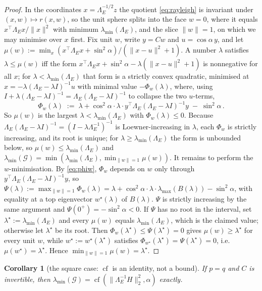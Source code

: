 \documentclass[11pt]{article}
\newtheorem{corollary}[theorem]{Corollary}
\theoremstyle{remark}
\newcommand{\Gr}{\mathcal{G}}
\newcommand{\Le}{\Lambda_E}
\begin{document}
\begin{proof}
In the coordinates $x=\Le^{-1/2}z$ the quotient \eqref{eq:rayleigh} is invariant under
$(x,w)\mapsto r(x,w)$, so the unit sphere splits into the face $w=0$, where it equals
$x^{\top}\Le x/\|x\|^{2}$ with minimum $\lambda_{\min}(\Le)$, and the slice $\|w\|=1$, on which we may
minimise over $x$ first. Fix unit $w$, write $y=Cw$ and $u=\cos\alpha\,y$, and let
$\mu(w):=\min_x(x^{\top}\Le x+\sin^2\alpha)/(\|x-u\|^2+1)$. A number $\lambda$ satisfies
$\lambda\le\mu(w)$ iff the form $x^{\top}\Le x+\sin^2\alpha-\lambda(\|x-u\|^2+1)$ is nonnegative for
all $x$; for $\lambda<\lambda_{\min}(\Le)$ that form is a strictly convex quadratic, minimised at
$x=-\lambda(\Le-\lambda I)^{-1}u$ with minimal value $-\Phi_w(\lambda)$, where, using
$I+\lambda(\Le-\lambda I)^{-1}=\Le(\Le-\lambda I)^{-1}$ to collapse the two $u$-terms,
\begin{equation}\label{eq:phiw}
  \Phi_w(\lambda)\;:=\;\lambda+\cos^2\alpha\cdot\lambda\cdot
  y^{\top}\Le(\Le-\lambda I)^{-1}y\;-\;\sin^2\alpha\,.
\end{equation}
So $\mu(w)$ is the largest $\lambda<\lambda_{\min}(\Le)$ with $\Phi_w(\lambda)\le0$. Because
$\Le(\Le-\lambda I)^{-1}=(I-\lambda\Le^{-1})^{-1}$ is Loewner-increasing in $\lambda$, each $\Phi_w$
is strictly increasing, and its root is unique; for $\lambda\ge\lambda_{\min}(\Le)$ the form is
unbounded below, so $\mu(w)\le\lambda_{\min}(\Le)$ and
$\lambda_{\min}(\Gr)=\min(\lambda_{\min}(\Le),\min_{\|w\|=1}\mu(w))$. It remains to perform the
$w$-minimisation. By \eqref{eq:phiw}, $\Phi_w$ depends on $w$ only through
$y^{\top}\Le(\Le-\lambda I)^{-1}y$, so
$\Psi(\lambda):=\max_{\|w\|=1}\Phi_w(\lambda)=\lambda+\cos^2\alpha\cdot\lambda\cdot
\lambda_{\max}(B(\lambda))-\sin^2\alpha$, with equality at a top eigenvector $w^{\star}(\lambda)$ of
$B(\lambda)$. $\Psi$ is strictly increasing by the same argument and $\Psi(0^+)=-\sin^2\alpha<0$.
If $\Psi$ has no root in the interval, set $\lambda^{\star}:=\lambda_{\min}(\Le)$ and every $\mu(w)$
equals $\lambda_{\min}(\Le)$, which is the claimed value; otherwise let $\lambda^{\star}$ be its root.
Then $\Phi_w(\lambda^{\star})\le\Psi(\lambda^{\star})=0$ gives $\mu(w)\ge\lambda^{\star}$ for every
unit $w$, while $w^{\star}:=w^{\star}(\lambda^{\star})$ satisfies
$\Phi_{w^{\star}}(\lambda^{\star})=\Psi(\lambda^{\star})=0$, i.e.\ $\mu(w^{\star})=\lambda^{\star}$.
Hence $\min_{\|w\|=1}\mu(w)=\lambda^{\star}$.
\end{proof}

\begin{corollary}[the square case: $\operatorname{cf}$ is an identity, not a bound]
\label{cor:square}
If $p=q$ and $C$ is invertible, then
$\lambda_{\min}(\Gr)=\operatorname{cf}(\|\Le^{-1}H\|_2^2,\alpha)$ exactly.
\end{corollary}
\end{document}
